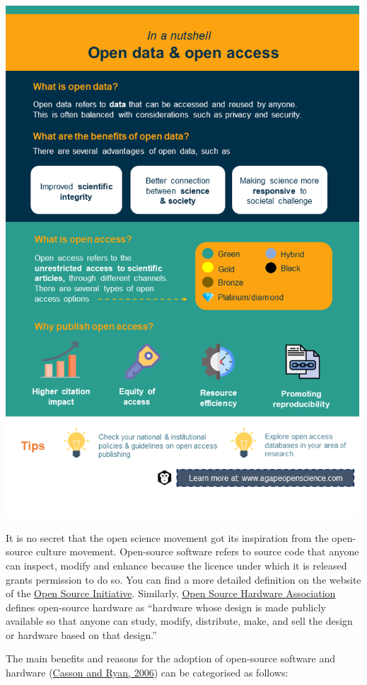 \documentclass[
]{book}
\begin{document}
\includegraphics[width=5.20833in,height=\textheight]{images/slide2.png}

It is no secret that the open science movement got its inspiration from the open-source culture movement. Open-source software refers to source code that anyone can inspect, modify and enhance because the licence under which it is released grants permission to do so. You can find a more detailed definition on the website of the \href{https://opensource.org/osd}{Open Source Initiative}. Similarly, \href{https://www.oshwa.org/definition/}{Open Source Hardware Association} defines open-source hardware as ``hardware whose design is made publicly available so that anyone can study, modify, distribute, make, and sell the design or hardware based on that design.''

The main benefits and reasons for the adoption of open-source software and hardware (\href{https://www.researchgate.net/publication/228296692_Open_Standards_Open_Source_Adoption_in_the_Public_Sector_and_Their_Relationship_to_Microsoft's_Market_Dominance}{Casson and Ryan, 2006}) can be categorised as follows:
\end{document}
